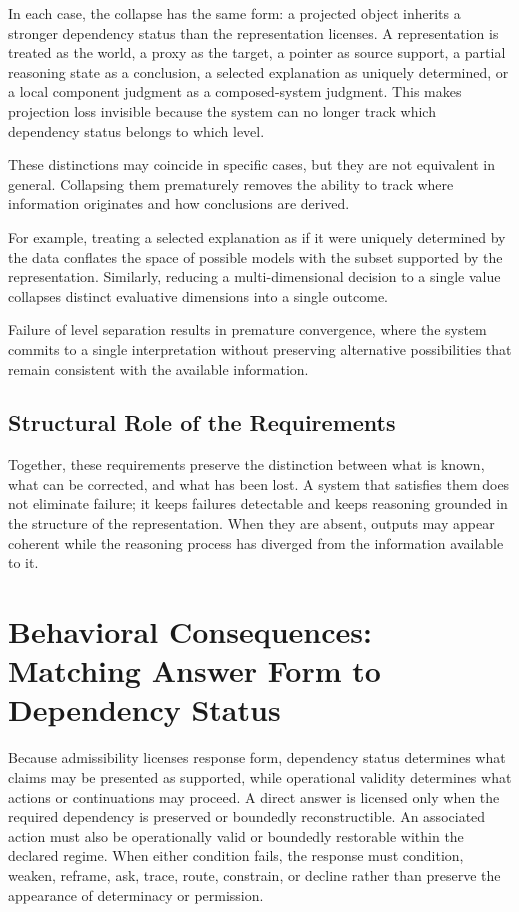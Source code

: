 \documentclass[11pt]{article}
\begin{document}
In each case, the collapse has the same form: a projected object inherits a stronger dependency status than the representation licenses. A representation is treated as the world, a proxy as the target, a pointer as source support, a partial reasoning state as a conclusion, a selected explanation as uniquely determined, or a local component judgment as a composed-system judgment. This makes projection loss invisible because the system can no longer track which dependency status belongs to which level.

These distinctions may coincide in specific cases, but they are not equivalent in general. Collapsing them prematurely removes the ability to track where information originates and how conclusions are derived.

For example, treating a selected explanation as if it were uniquely determined by the data conflates the space of possible models with the subset supported by the representation. Similarly, reducing a multi-dimensional decision to a single value collapses distinct evaluative dimensions into a single outcome.

Failure of level separation results in premature convergence, where the system commits to a single interpretation without preserving alternative possibilities that remain consistent with the available information.

\subsection{Structural Role of the Requirements}

Together, these requirements preserve the distinction between what is known, what can be corrected, and what has been lost. A system that satisfies them does not eliminate failure; it keeps failures detectable and keeps reasoning grounded in the structure of the representation. When they are absent, outputs may appear coherent while the reasoning process has diverged from the information available to it.

\section{Behavioral Consequences: Matching Answer Form to Dependency Status}

Because admissibility licenses response form, dependency status determines what claims may be presented as supported, while operational validity determines what actions or continuations may proceed. A direct answer is licensed only when the required dependency is preserved or boundedly reconstructible. An associated action must also be operationally valid or boundedly restorable within the declared regime. When either condition fails, the response must condition, weaken, reframe, ask, trace, route, constrain, or decline rather than preserve the appearance of determinacy or permission.
\end{document}
